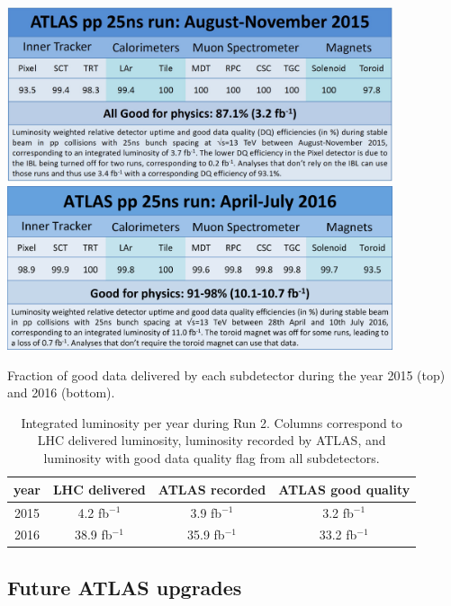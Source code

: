 \bfig[b!]
\centering
\includegraphics[width=0.85\textwidth]{figures/Detector/DQ2015.png}
\includegraphics[width=0.85\textwidth]{figures/Detector/DQ2016.png}
\captionsetup{width=0.85\textwidth} \caption{\small Fraction of good data delivered by each subdetector during the year 2015 (top) and 2016 (bottom).}
\label{sec:det:fig:ATLASDQ}
\efig



\begin{table}
\begin{center}
\begin{tabular}{c|c|c|c}
  \hline \hline
  year & LHC delivered & ATLAS recorded & ATLAS good quality \\
  \hline
 2015 & 4.2 fb$^{-1}$ & 3.9 fb$^{-1}$ & 3.2 fb$^{-1}$ \\
 2016 & 38.9 fb$^{-1}$ & 35.9 fb$^{-1}$ & 33.2 fb$^{-1}$ \\
  
  \hline\hline

\end{tabular}
\captionsetup{width=0.85\textwidth} \caption{\small Integrated luminosity per year during Run 2. Columns correspond to LHC delivered luminosity, luminosity recorded by ATLAS, and luminosity with good data quality flag from all subdetectors.}
\label{sec:det:tab:atlum}
\end{center}
\end{table}



\subsection{Future ATLAS upgrades}

